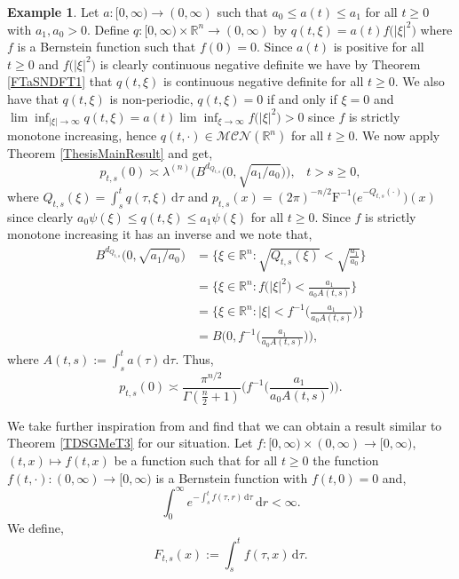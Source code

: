 \documentclass[a4paper, 12pt]{report}
\theoremstyle{cor}
\theoremstyle{remark}
\theoremstyle{definition}
\newtheorem{eg}[theorem]{Example}
\begin{document}
\begin{eg}
Let $a : [0, \infty) \to (0, \infty)$ such that $a_0 \le a(t) \le a_1$ for all $t \ge 0$ with $a_1, a_0 > 0$.  Define $q : [0, \infty) \times \mathbb{R}^n \to (0, \infty)$ by $q(t, \xi) = a(t)f\big(|\xi|^2\big)$ where $f$ is a Bernstein function such that $f(0) = 0$.  Since $a(t)$ is positive for all $t \ge 0$ and $f\big(|\xi|^2\big)$ is clearly continuous negative definite we have by Theorem \ref{FTaSNDFT1} that $q(t, \xi)$ is continuous negative definite for all $t \ge 0$.  We also have that $q(t, \xi)$ is non-periodic, $q(t, \xi) = 0$ if and only if $\xi = 0$ and $\lim\inf_{|\xi| \to \infty}q(t, \xi) = a(t)\lim\inf_{\xi \to \infty}f\big(|\xi|^2\big) > 0$ since $f$ is strictly monotone increasing, hence $q(t, \cdot) \in \mathcal{MCN}(\mathbb{R}^n)$ for all $t \ge 0$.  We now apply Theorem \ref{ThesisMainResult} and get,
$$
p_{t, s}(0) \asymp \lambda^{(n)}\Big(B^{d_{Q_{t, s}}}\big(0, \sqrt{a_1/a_0}\big)\Big), \,\,\,\,\, t > s \ge 0,
$$
where $Q_{t, s}(\xi) = \int_s^tq(\tau, \xi)\,\mathrm{d}\tau$ and $p_{t, s}(x) = (2\pi)^{-n/2}\mathrm{F}^{-1}\big(e^{-Q_{t, s}(\cdot)}\big)(x)$ since clearly $a_0\psi(\xi) \le q(t, \xi) \le a_1\psi(\xi)$ for all $t \ge 0$.  Since $f$ is strictly monotone increasing it has an inverse and we note that,
$$
\begin{aligned}
B^{d_{Q_{t, s}}}\big(0, \sqrt{a_1/a_0}\big) & = \bigg\{\xi \in \mathbb{R}^n : \sqrt{Q_{t, s}(\xi)} < \sqrt{\frac{a_1}{a_0}}\bigg\}\\
& = \bigg\{\xi \in \mathbb{R}^n : f\big(|\xi|^2\big) < \frac{a_1}{a_0A(t, s)}\bigg\}\\
& = \bigg\{\xi \in \mathbb{R}^n : |\xi| < f^{-1}\Big(\frac{a_1}{a_0A(t, s)}\Big)\bigg\}\\
& = B\bigg(0, f^{-1}\Big(\frac{a_1}{a_0A(t, s)}\Big)\bigg),
\end{aligned}
$$
where $A(t, s) := \int_s^ta(\tau)\,\mathrm{d}\tau$.  Thus,
$$
p_{t, s}(0) \asymp \frac{\pi^{n/2}}{\Gamma(\frac{n}{2} + 1)}\bigg(f^{-1}\Big(\frac{a_1}{a_0A(t, s)}\Big)\bigg).
$$
\end{eg}

We take further inspiration from \cite{Paper} and find that we can obtain a result similar to Theorem \ref{TDSGMeT3} for our situation.  Let $f : [0, \infty) \times (0, \infty) \to [0, \infty)$, $(t, x) \mapsto f(t, x)$ be a function such that for all $t \ge 0$ the function $f(t, \cdot) : (0, \infty) \to [0, \infty)$ is a Bernstein function with $f(t, 0) = 0$ and,
$$
\int_0^\infty e^{-\int_s^t f(\tau, r)\,\mathrm{d}\tau}\,\mathrm{d}r < \infty.
$$
We define,
\begin{equation}
F_{t, s}(x) := \int_s^t f(\tau, x)\,\mathrm{d}\tau\label{BF}.
\end{equation}
\end{document}
